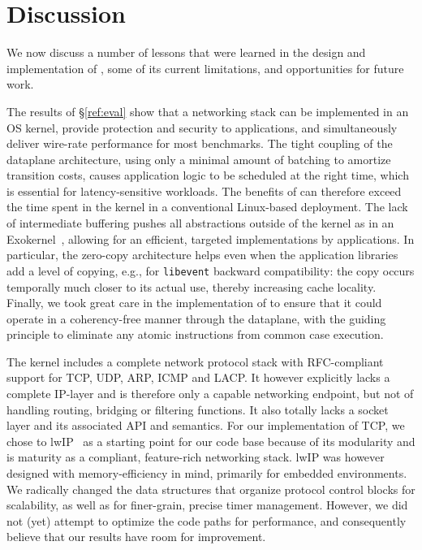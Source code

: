 
\section{Discussion}
\label{sec:disc}

We now discuss a number of lessons that were learned in the design and
implementation of \ix, some of its current limitations, and
opportunities for future work.

 The results of \S\ref{ref:eval}
show that a networking stack can be implemented in an OS kernel,
provide protection and security to applications, and simultaneously
deliver wire-rate performance for most benchmarks.  The tight coupling
of the dataplane architecture, using only a minimal amount of batching
to amortize transition costs, causes application logic to be scheduled
at the right time, which is essential for latency-sensitive workloads.
The benefits of \ix can therefore exceed the time spent in the kernel
in a conventional Linux-based deployment.  The lack of intermediate
buffering pushes all abstractions outside of the kernel as in an
Exokernel~\cite{DBLP:conf/sosp/EnglerKO95}, allowing for an efficient,
targeted implementations by applications.  In particular, the
zero-copy architecture helps even when the application libraries add a
level of copying, e.g., for \texttt{libevent} backward compatibility:
the copy occurs temporally much closer to its actual use, thereby
increasing cache locality.  Finally, we took great care in the
implementation of \ix to ensure that it could operate in a
coherency-free manner through the dataplane, with the guiding
principle to eliminate any atomic instructions from common case
execution.

The \ix kernel includes a complete network protocol stack with
RFC-compliant support for TCP, UDP, ARP, ICMP and LACP.  It however
explicitly lacks a complete IP-layer and is therefore only a capable
networking endpoint, but not of handling routing, bridging or
filtering functions.  It also totally lacks a socket layer and its
associated API and semantics.  For our implementation of TCP, we chose
to lwIP~\cite{dunkels2001design} as a starting point for our code base because of its
modularity and is maturity as a compliant, feature-rich networking
stack.  lwIP was however designed with memory-efficiency in mind,
primarily for embedded environments.  We radically changed the data
structures that organize protocol control blocks for scalability, as
well as for finer-grain, precise timer management.  However, we did
not (yet) attempt to optimize the code paths for performance, and
consequently believe that our results have room for improvement.



